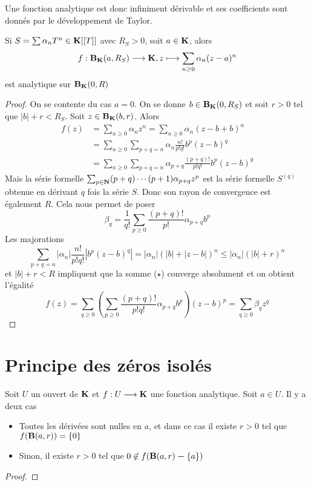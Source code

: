 \begin{rem}
Une fonction analytique est donc infiniment dérivable et ses coefficients sont donnés par le développement de Taylor.
\end{rem}

\begin{thm}
    Si $S=\sum \alpha_nT^n \in \mathbf K [[T]]$ avec $R_S>0$, soit $a \in  \mathbf K$, alors \[
        f: \mathbf B_\mathbf K(a, R_S) \longrightarrow \mathbf K, z \longmapsto \sum_{n\geq 0} \alpha_n(z-a)^n
    \] 
    est analytique sur $\mathbf B_\mathbf K(0, R)$
\end{thm}

\begin{proof}
    On se contente du cas $a=0$. On se donne  $b \in  \mathbf B_\mathbf K(0, R_S)$ et soit $r >0$ tel que $|b|+r<R_S$. Soit  $z \in  \mathbf B_\mathbf K(b, r)$. Alors
\begin{align*}
f(z) &=\sum_{n \geq 0} \alpha_{n} z^{n}=\sum_{n \geq 0} \alpha_{n}(z-b+b)^{n} \\
&=\sum_{n \geq 0} \sum_{p+q=n} \alpha_{n} \frac{n !}{p ! q !} b^{p}(z-b)^{q} \\
&=\sum_{n \geq 0} \sum_{p+q=n} \alpha_{p+q} \frac{(p+q) !}{p ! q !} b^{p}(z-b)^{q} \tag{$\star$}
\end{align*}
Mais la série formelle $\sum_{p \in \mathbf N}(p+q) \cdots(p+1) \alpha_{p+q} z^{p}$ est la série formelle $S^{(q)}$ obtenue en dérivant $q$ fois la série $S .$ Donc son rayon de convergence est également $R$. Cela nous permet de poser
\[
\beta_{q}=\frac{1}{q !} \sum_{p \geq 0} \frac{(p+q) !}{p !} \alpha_{p+q} b^{p}
\]
Les majorations
\[
\sum_{p+q=n}\left|\alpha_{n}\right| \frac{n !}{p ! q !}\left|b^{p}(z-b)^{q}\right|=\left|\alpha_{n}\right|(|b|+|z-b|)^{n} \leq\left|\alpha_{n}\right|(|b|+r)^{n}
\]
et $|b|+r<R$ impliquent que la somme ($\star$) converge absolument et on obtient l'égalité
\[
f(z)=\sum_{q \geq 0}\left(\sum_{p \geq 0} \frac{(p+q) !}{p ! q !} \alpha_{p+q} b^{p}\right)(z-b)^{p}=\sum_{q \geq 0} \beta_{q} z^{q}
\]
\end{proof}

\section{Principe des zéros isolés}

\begin{thm}
Soit $U$ un ouvert de  $\mathbf K$ et $f:U \longrightarrow \mathbf K$ une fonction analytique. Soit $a \in U$. Il y a deux cas \begin{itemize}
    \item Toutes les dérivées sont nulles en $a$, et dans ce cas il existe  $r>0$ tel que  $f(\mathbf B(a, r))= \left\{ 0 \right\} $ 
    \item Sinon, il existe $r>0$ tel que  $0 \not \in f(\mathbf B(a, r)\bm- \left\{ a \right\} )$
\end{itemize}
\end{thm}

\begin{proof}

\end{proof}
